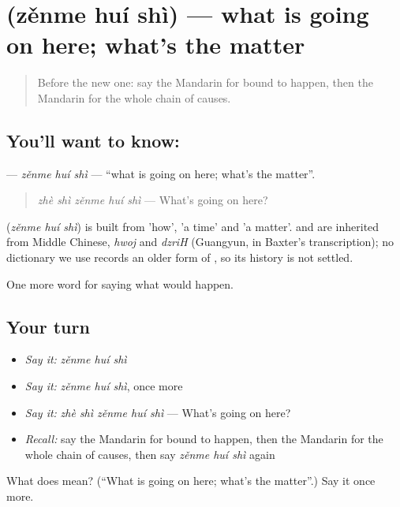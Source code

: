 \section[\texorpdfstring{\zh{怎么回事} (zěnme huí shì)}{怎么回事 (zěnme huí shì)}]{ (zěnme huí shì) — what is going on here; what's the matter}

\label{lesson:ZH-C540-zenmehuishi}



\begin{quote}
Before the new one: say the Mandarin for bound to happen, then the Mandarin for the whole chain of causes.
\end{quote}

\subsection*{You'll want to know: }
\textbf{} — \emph{zěnme huí shì} — \textquotedblleft{}what is going on here; what's the matter\textquotedblright{}.

\begin{quote}
\textbf{} \emph{zhè shì zěnme huí shì} — What's going on here?
\end{quote}

\begin{cousinweb}
\textbf{} (\emph{zěnme huí shì}) is built from  'how',  'a time' and  'a matter'.  and  are inherited from Middle Chinese, \emph{hwoj} and \emph{dzriH} (Guangyun, in Baxter's transcription); no dictionary we use records an older form of , so its history is not settled.
\end{cousinweb}

\begin{grammarlens}[title={What you've built}]
One more word for saying what would happen.
\end{grammarlens}

\subsection*{Your turn}
\begin{itemize}
\raggedright
  \item \emph{Say it:} \emph{zěnme huí shì}
  \item \emph{Say it:} \emph{zěnme huí shì}, once more
  \item \emph{Say it:} \emph{zhè shì zěnme huí shì} — What's going on here?
  \item \emph{Recall:} say the Mandarin for bound to happen, then the Mandarin for the whole chain of causes, then say \emph{zěnme huí shì} again
\end{itemize}

\begin{tcolorbox}[breakable,colback=teal!4,colframe=teal!35!black,title={Before you move on}]
What does  mean? (\textquotedblleft{}What is going on here; what's the matter\textquotedblright{}.) Say it once more.
\end{tcolorbox}
